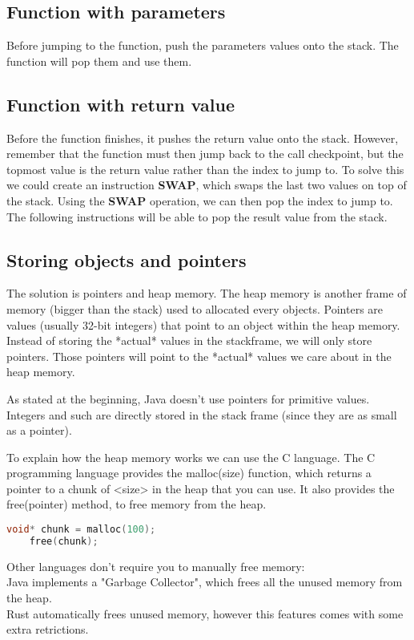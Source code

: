 \documentclass[../documentation.tex]{subfiles}
\begin{document}
\subsection{Function with parameters}

Before jumping to the function, push the parameters values onto the stack.
The function will pop them and use them.

\subsection{Function with return value}

Before the function finishes, it pushes the return value onto the stack.
However, remember that the function must then jump back to the call checkpoint,
but the topmost value is the return value rather than the index to jump to.
To solve this we could create an instruction \textbf{SWAP}, which swaps the last two values on top of the stack.
Using the \textbf{SWAP} operation, we can then pop the index to jump to. The following instructions will be able to pop
the result value from the stack.

\subsection{Storing objects and pointers}

The solution is pointers and heap memory.
The heap memory is another frame of memory (bigger than the stack) used to allocated every objects.
Pointers are values (usually 32-bit integers) that point to an object within the heap memory.
Instead of storing the *actual* values in the stackframe, we will only store pointers.
Those pointers will point to the *actual* values we care about in the heap memory.

As stated at the beginning, Java doesn't use pointers for primitive values. Integers and such
are directly stored in the stack frame (since they are as small as a pointer).

To explain how the heap memory works we can use the C language.
The C programming language provides the malloc(size) function, which returns a pointer to a chunk of <size> in the heap that you can use.
It also provides the free(pointer) method, to free memory from the heap.

\begin{lstlisting}[language=C]
    void* chunk = malloc(100);
    free(chunk);
\end{lstlisting}

Other languages don't require you to manually free memory: \\
Java implements a "Garbage Collector", which frees all the unused memory from the heap. \\
Rust automatically frees unused memory, however this features comes with some extra retrictions.

% 
\end{document}
